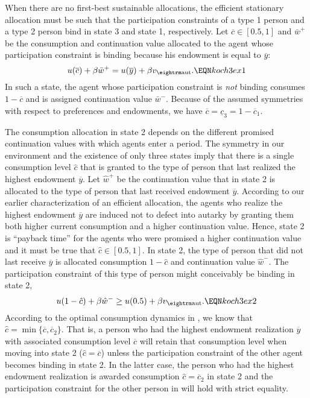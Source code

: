 When there are no first-best sustainable allocations, the
efficient stationary allocation must be such that the
participation constraints of a type 1 person and a type 2 person
bind in state 3 and state 1, respectively. Let $\overline
c\in[0.5, 1]$ and $\bar w^+$ be the consumption and continuation
value allocated to the agent whose participation constraint is
binding because his endowment is equal to $\overline y$:
$$ u(\overline c) + \beta \bar w^+ = u(\overline y)
  + \beta v_{\rm aut} . \EQN koch3ex1 $$
In such a state, the agent whose participation constraint
is {\it not\/} binding consumes $1-\overline c$ and is assigned
continuation value
$\bar w^-$. Because of the assumed symmetries with respect to
preferences and endowments, we have
$\overline c = \underline c_3 = 1-\overline c_1$.

The consumption allocation in state 2 depends on
the different promised continuation values with which
agents enter a period.
The symmetry in our
environment and the existence of only three states imply that
there is a single consumption level $\hat c$ that is granted to
the type of person that last realized the highest endowment
$\overline y$.
Let  $\hat w^+$ be the continuation
value that in state 2 is
allocated to the type of person that last received endowment
$\overline y$.
 According to our earlier characterization of an
efficient allocation, the agents who realize the highest endowment
$\overline y$ are induced not to defect into autarky by granting them
both higher current consumption and a higher continuation value.
Hence, state 2 is ``payback time'' for the agents who were promised
a higher continuation value and it must be true that
$\hat c \in [0.5, 1]$. In state 2, the type of person that
did not last receive $\overline y$ is
allocated consumption $1-\hat c$ and continuation value
$\hat w^-$. The participation constraint of this type of person
might conceivably be binding in state 2,
$$u(1-\hat c) + \beta \hat w^- \geq u(0.5)
  + \beta v_{\rm aut} . \EQN koch3ex2 $$
According to the optimal consumption dynamics in ,
we know that $\hat c = \min \{\overline c, \overline c_2\}$. That is,
a person who had the highest endowment realization $\overline y$
with associated consumption level $\overline c$ will retain
that consumption level when moving into state 2
($\hat c = \overline c$) unless
the participation constraint of the other agent becomes binding
in state 2. In the latter case, the person who had the highest
endowment realization is awarded consumption
$\hat c = \overline c_2$ in state 2
and the participation constraint for the other person in 
will hold with strict equality.


